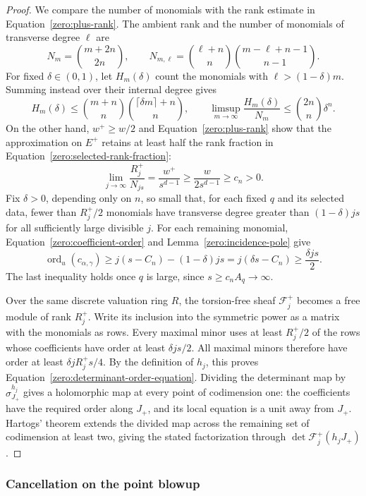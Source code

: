 \begin{proof}
We compare the number of monomials with the rank estimate in
Equation~\eqref{zero:plus-rank}.  The
ambient rank and the number of monomials of transverse degree \(\ell\)
are
\[
 N_m=\binom{m+2n}{2n},\qquad
 N_{m,\ell}=\binom{\ell+n}{n}
             \binom{m-\ell+n-1}{n-1}.
\]
For fixed \(\delta\in(0,1)\), let \(H_m(\delta)\) count the monomials
with \(\ell>(1-\delta)m\).  Summing instead over their internal
degree gives
\[
 H_m(\delta)
 \le \binom{m+n}{n}\binom{\lceil\delta m\rceil+n}{n},\qquad
 \limsup_{m\to\infty}\frac{H_m(\delta)}{N_m}
       \le\binom{2n}{n}\delta^n.
\]
On the other hand, \(w^+\ge w/2\) and
Equation~\eqref{zero:plus-rank} show that the approximation on \(E^+\)
retains at least half the rank fraction in
Equation~\eqref{zero:selected-rank-fraction}:
\[
 \lim_{j\to\infty}\frac{R_j^+}{N_{js}}
       =\frac{w^+}{s^{d-1}}
       \ge\frac{w}{2s^{d-1}}\ge c_n>0.
\]
Fix \(\delta>0\), depending only on \(n\), so small that, for each fixed
\(q\) and its selected data, fewer than \(R_j^+/2\) monomials have transverse
degree greater than \((1-\delta)js\) for all sufficiently large divisible
\(j\).  For each
remaining monomial, Equation~\eqref{zero:coefficient-order} and
Lemma~\ref{zero:incidence-pole} give
\[
 \operatorname{ord}_u(c_{\alpha,\gamma})
   \ge j(s-C_n)-(1-\delta)js
   =j(\delta s-C_n)\ge\frac{\delta js}{2}.
\]
The last inequality holds once \(q\) is large, since
\(s\ge c_nA_q\to\infty\).

Over the same discrete valuation ring \(R\), the torsion-free sheaf
\(\mathcal F_j^+\) becomes a free module of rank \(R_j^+\).  Write its
inclusion into the symmetric power as a matrix with the monomials
as rows.  Every maximal minor uses at least \(R_j^+/2\) of the rows
whose coefficients have order at least \(\delta js/2\).  All maximal
minors therefore have order at least
\(\delta jR_j^+s/4\).  By the definition of \(h_j\), this proves
Equation~\eqref{zero:determinant-order-equation}.  Dividing the determinant
map by \(\sigma_{J_+}^{h_j}\) gives a holomorphic map at every point of
codimension one: the coefficients have the required order along \(J_+\),
and its local equation is a unit away from \(J_+\).  Hartogs' theorem
extends the divided map across the remaining set of codimension at least
two, giving the stated factorization through
\(\det\mathcal F_j^+(h_jJ_+)\).
\end{proof}

\subsubsection{Cancellation on the point blowup}

